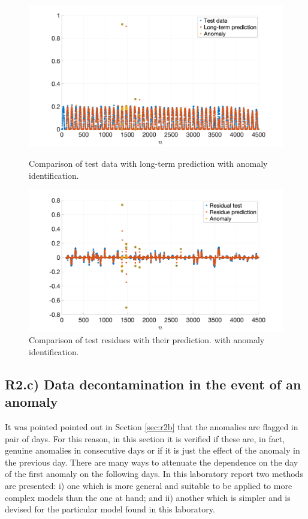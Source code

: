 \documentclass[a4paper, oneside, 11pt]{article}
\begin{document}
\begin{figure}[htbp]
	\centering
	\begin{minipage}[b]{.49\textwidth}
		\centering
		\includegraphics[width= 1.1\textwidth]{figures/R2b_test_an.png}
		\caption{Comparison of test data with long-term prediction with anomaly identification.}
		\label{fig:R2b_test_an}
	\end{minipage}
	\hfill
	\begin{minipage}[b]{.49\textwidth}
		\centering
		\includegraphics[width= 1.1\textwidth]{figures/R2b_residual_an.png}
		\caption{Comparison of test residues with their prediction. with anomaly identification.}
		\label{fig:R2b_residual_an}
	\end{minipage}
\end{figure}

\subsection{R2.c) Data decontamination in the event of an anomaly}
It was pointed pointed out in Section \ref{sec:r2b} that the anomalies are flagged in pair of days. For this reason, in this section it is verified if these are, in fact, genuine anomalies in consecutive days or if it is just the effect of the anomaly in the previous day. There are many ways to attenuate the dependence on the day of the first anomaly on the following days. In this laboratory report two methods are presented: i) one which is more general and suitable to be applied to more complex models than the one at hand; and ii) another which is simpler and is devised for the particular model found in this laboratory.
\end{document}

